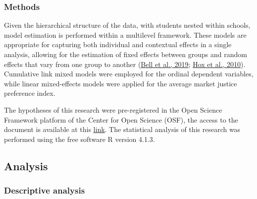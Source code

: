 \documentclass[
  letterpaper,
  DIV=11,
  numbers=noendperiod]{scrartcl}
\begin{document}
\hypertarget{methods-1}{%
\subsubsection{Methods}\label{methods-1}}

Given the hierarchical structure of the data, with students nested
within schools, model estimation is performed within a multilevel
framework. These models are appropriate for capturing both individual
and contextual effects in a single analysis, allowing for the estimation
of fixed effects between groups and random effects that vary from one
group to another (\protect\hyperlink{ref-bell_fixed_2019}{Bell et al.,
2019}; \protect\hyperlink{ref-hox_multilevel_2010}{Hox et al., 2010}).
Cumulative link mixed models were employed for the ordinal dependent
variables, while linear mixed-effects models were applied for the
average market justice preference index.

The hypotheses of this research were pre-registered in the Open Science
Framework platform of the Center for Open Science (OSF), the access to
the document is available at this
\href{https://doi.org/10.17605/OSF.IO/UFSDV}{link}. The statistical
analysis of this research was performed using the free software R
version 4.1.3.

\hypertarget{analysis}{%
\subsection{Analysis}\label{analysis}}

\hypertarget{descriptive-analysis}{%
\subsubsection{Descriptive analysis}\label{descriptive-analysis}}
\end{document}
